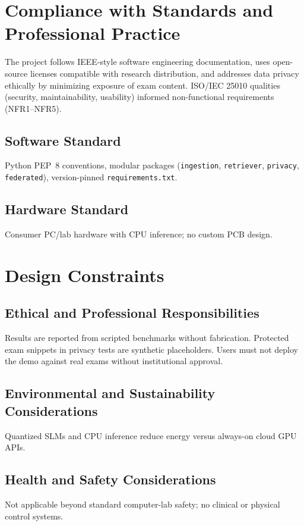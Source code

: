 
\section{Compliance with Standards and Professional Practice}
The project follows IEEE-style software engineering documentation, uses open-source licenses compatible with research distribution, and addresses data privacy ethically by minimizing exposure of exam content. ISO/IEC 25010 qualities (security, maintainability, usability) informed non-functional requirements (NFR1--NFR5).

\subsection{Software Standard}
Python PEP~8 conventions, modular packages (\texttt{ingestion}, \texttt{retriever}, \texttt{privacy}, \texttt{federated}), version-pinned \texttt{requirements.txt}.

\subsection{Hardware Standard}
Consumer PC/lab hardware with CPU inference; no custom PCB design.

\section{Design Constraints}
\subsection{Ethical and Professional Responsibilities}
Results are reported from scripted benchmarks without fabrication. Protected exam snippets in privacy tests are synthetic placeholders. Users must not deploy the demo against real exams without institutional approval.

\subsection{Environmental and Sustainability Considerations}
Quantized SLMs and CPU inference reduce energy versus always-on cloud GPU APIs.

\subsection{Health and Safety Considerations}
Not applicable beyond standard computer-lab safety; no clinical or physical control systems.

